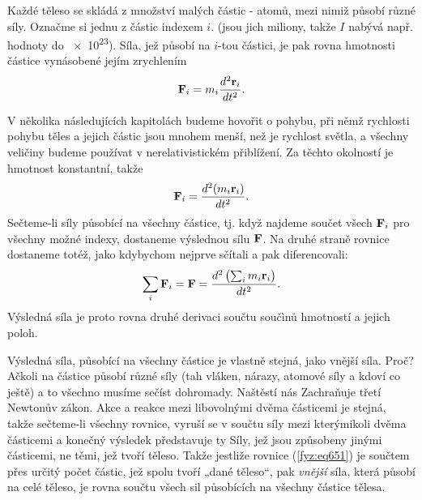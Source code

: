     Každé těleso se skládá z množství malých částic - atomů, mezi nimiž působí různé síly. Označme
    si jednu z částic indexem \(i\). (jsou jich miliony, takže \(I\) nabývá např. hodnoty do
    \num{e23}). Síla, jež působí na \(i\)-tou částici, je pak rovna hmotnosti částice vynásobené
    jejím zrychlením
    \begin{equation}\label{fyz:eq649}
      \mathbf{F}_i=m_i\dfrac{d^2 \mathbf{r}_i}{d t^2}.
    \end{equation}
   
    V několika následujících kapitolách budeme hovořit o pohybu, při němž rychlosti pohybu těles a
    jejich částic jsou mnohem menší, než je rychlost světla, a všechny veličiny budeme používat v
    nerelativistickém přiblížení. Za těchto okolností je hmotnost konstantní, takže
    \begin{equation}\label{fyz:eq650}
      \mathbf{F}_i=\dfrac{d^2 (m_i\mathbf{r}_i)}{d t^2}.
    \end{equation}
    Sečteme-li síly působící na všechny částice, tj. když najdeme součet všech \(\mathbf{F}_i\) pro
    všechny možné indexy, dostaneme výslednou sílu \(\mathbf{F}\). Na druhé straně rovnice dostaneme
    totéž, jako kdybychom nejprve sčítali a pak diferencovali:
    \begin{equation}\label{fyz:eq651}
      \sum_i\mathbf{F}_i=\mathbf{F}=\dfrac{d^2 \left(\sum_im_i\mathbf{r}_i\right)}{d t^2}.
    \end{equation}
    Výsledná síla je proto rovna druhé derivaci součtu součìnů hmotností a jejich poloh.

    Výsledná síla, působící na všechny částice je vlastně stejná, jako vnější síla. Proč? Ačkoli na
    částice působí různé síly (tah vláken, nárazy, atomové síly a kdoví co ještě) a to všechno
    musíme sečíst dohromady. Naštěstí nás Zachraňuje třetí Newtonův zákon. Akce a reakce mezi
    libovolnými dvěma částicemi je stejná, takže sečteme-li všechny rovnice, vyruší se v součtu síly
    mezi kterýmikoli dvěma částicemi a konečný výsledek představuje ty Síly, jež jsou způsobeny
    jinými částicemi, ne těmi, jež tvoří těleso. Takže jestliže rovnice (\ref {fyz:eq651}) je
    součtem přes určitý počet částic, jež spolu tvoří „dané těleso“, pak \emph{vnější} síla, která
    působí na celé těleso, je rovna součtu všech sil působících na všechny částice tělesa.

